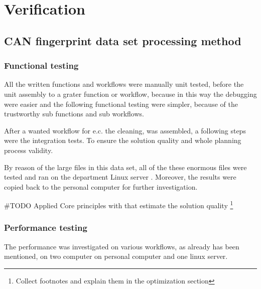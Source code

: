 \chapter{Verification}
\section{CAN fingerprint data set processing method}
\subsection{Functional testing}
All the written functions and workflows were manually unit tested, before the unit assembly to a grater function or workflow, because in this way the debugging were easier and the following functional testing were simpler, because of the trustworthy sub functions and sub workflows.

After a wanted workflow for e.c. the cleaning, was assembled, a following steps were the integration tests. To ensure the solution quality and whole planning process validity.

By reason of the large files in this data set, all of the these enormous files were tested and ran on the department Linux server \cite{Batman}.
Moreover, the results were copied back to the personal computer for further investigation.

\#TODO Applied Core principles with that estimate the solution quality
\footnote{Collect footnotes and explain them in the optimization section}
\subsection{Performance testing}
The performance was investigated on various workflows, as already has been mentioned, on two computer on personal computer\cite{Latitude} and one linux server\cite{Batman}.


